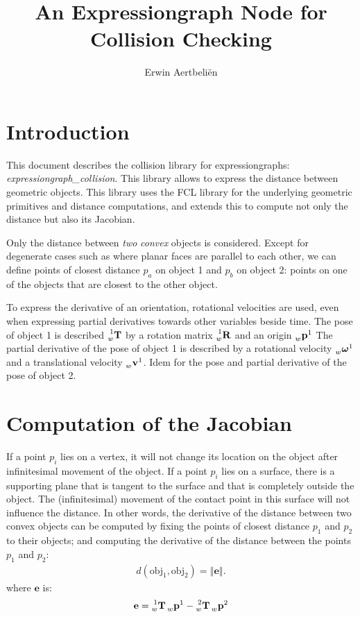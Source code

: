 \documentclass[10pt,a4paper]{article}
\author{Erwin Aertbeli\"en}
\title{An Expressiongraph Node for Collision Checking}
\newcommand{\transf}[2]{ \prescript{#2}{#1}{\mathbf{T}} }
\newcommand{\rotm}[2]{ \prescript{#2}{#1}{\mathbf{R}} }
\newcommand{\position}[2] {\prescript{}{#1}{\mathbf{p}}^{#2}}
\newcommand{\velocity}[2] {\prescript{}{#1}{\mathbf{v}}^{#2}}
\newcommand{\rotvel}[2] {\prescript{}{#1}{\boldsymbol{\omega}}^{#2}}
\begin{document}
\maketitle



\section{Introduction}
This document describes the collision library for expressiongraphs: \emph{expressiongraph\_collision}.  This library allows to express the distance between geometric objects.  This library uses the FCL library for 
the underlying geometric primitives and distance computations, and extends this to compute
not only the distance but also its Jacobian.

Only the distance between \emph{two} \emph{convex} objects is considered. Except for degenerate cases such as where planar faces are parallel to each other, we can define points of closest distance $p_a$ on object 1 and $p_b$ on object 2: points on one of the objects that are closest to the other object. 

To express the derivative of an orientation, rotational velocities are used, even when expressing partial derivatives towards other variables beside time.  The pose of object 1 is described $\transf{w}{1}$ by a rotation matrix $\rotm{w}{1}$ and an origin $\position{w}{1}$ The partial derivative of the pose of object 1 is described by a rotational velocity $\rotvel{w}{1}$ and a translational velocity $\velocity{w}{1}$.  Idem for the pose and partial derivative of the pose of object 2.


\section{Computation of the Jacobian}

If a point $p_i$ lies on a vertex, it will not change its location on the object after
infinitesimal movement of the object.  If a point $p_i$ lies on a surface, there is a supporting plane that is tangent to the surface and that is completely outside the object.
The (infinitesimal) movement of the contact point in this surface will not influence the
distance.  In other words, the derivative of the distance between two convex objects can
be computed by fixing the points of closest distance $p_1$ and $p_2$ to their objects; and computing the derivative of the distance between the points $p_1$ and $p_2$:
\begin{align}
d(\mathrm{obj}_1, \mathrm{obj}_2) = \left\Vert \mathbf{e} \right\Vert.
\end{align}
where $\mathbf{e}$ is:
\begin{align}
\mathbf{e} = \transf{w}{1}\position{w}{1} - \transf{w}{2}\position{w}{2}
\end{align}
\end{document}
